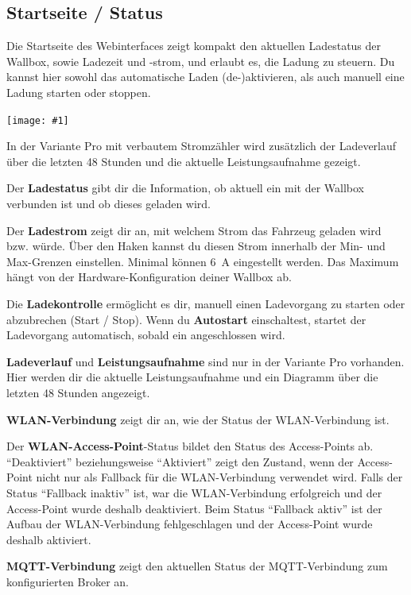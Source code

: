 \documentclass[a4paper,10pt]{article}
\newcommand{\gfx}[1]{\texttt{[image: \#1]}}
\begin{document}
\begin{multicols*}{2}
	\subsection{Startseite / Status}
	Die Startseite des Webinterfaces zeigt kompakt den aktuellen Ladestatus der
	Wallbox, sowie Ladezeit und -strom, und erlaubt es, die Ladung zu steuern.
	Du kannst hier sowohl das automatische Laden (de-)aktivieren, als auch
	manuell eine Ladung starten oder stoppen.

	\gfx{./img_warp2/resized/web_status}

	In der Variante Pro mit verbautem Stromzähler wird zusätzlich der Ladeverlauf
	über die letzten 48 Stunden und die aktuelle Leistungsaufnahme gezeigt.

	Der \textbf{Ladestatus} gibt dir die Information, ob aktuell ein
	 mit der Wallbox verbunden ist und ob dieses geladen wird.

	Der \textbf{Ladestrom} zeigt dir an, mit welchem Strom das Fahrzeug geladen
	wird bzw. würde. Über den Haken kannst du diesen Strom innerhalb der Min-
	und Max-Grenzen einstellen. Minimal können \SI{6}{\ampere} eingestellt werden. Das
	Maximum hängt von der Hardware-Konfiguration deiner Wallbox ab.

	Die \textbf{Ladekontrolle} ermöglicht es dir, manuell einen Ladevorgang zu
	starten oder abzubrechen (Start / Stop). Wenn du \textbf{Autostart}
	einschaltest, startet der Ladevorgang automatisch, sobald ein
	angeschlossen wird.

	\textbf{Ladeverlauf} und \textbf{Leistungsaufnahme} sind nur in der Variante Pro
	vorhanden. Hier werden dir die aktuelle Leistungsaufnahme und ein Diagramm über
	die letzten 48 Stunden angezeigt.

	\textbf{WLAN-Verbindung} zeigt dir an, wie der Status der WLAN-Verbindung ist.

	Der \textbf{WLAN-Access-Point}-Status bildet den Status des Access-Points ab.
	\enquote{Deaktiviert} beziehungsweise \enquote{Aktiviert} zeigt den Zustand, wenn der Access-Point nicht
	nur als Fallback für die WLAN-Verbindung verwendet wird. Falls der Status \enquote{Fallback inaktiv} ist,
	war die WLAN-Verbindung erfolgreich und der Access-Point wurde deshalb deaktiviert.
	Beim Status \enquote{Fallback aktiv} ist der Aufbau der WLAN-Verbindung fehlgeschlagen und der
	Access-Point wurde deshalb aktiviert.

	\textbf{MQTT-Verbindung} zeigt den aktuellen Status der MQTT-Verbindung
	zum konfigurierten Broker an.


\end{multicols*}
\end{document}
